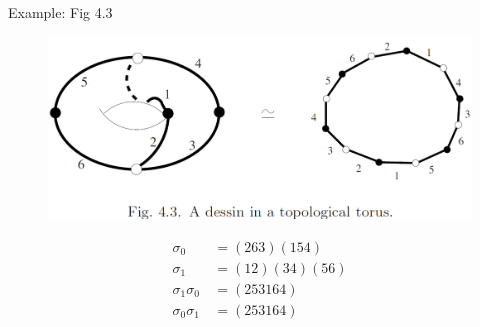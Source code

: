 \documentclass[pdf]{beamer}
\numberwithin{equation}{section}
\theoremstyle{plain}
\theoremstyle{plain}
\theoremstyle{remark}
\begin{document}
\begin{frame}[fragile]{Example: Fig 4.3}
\begin{figure}[th]
	\begin{minipage}[t]{.8\textwidth}
		\centering
		\vspace{0cm}
		\includegraphics[width=\textwidth]{figures/Fig4-3-2.png}
	\end{minipage}

\begin{minipage}[t]{.4\textwidth}
	\begin{equation*}
		\begin{aligned}
		\sigma_0 & \, = (263)(154) \\
		\sigma_1 & \, = (12)(34)(56) \\
		\sigma_1\sigma_0 & \, = (253164)\\
		\sigma_0\sigma_1 & \, = (253164)
		\end{aligned}
	\end{equation*}
\end{minipage}
\end{figure}
\end{frame}
\end{document}
